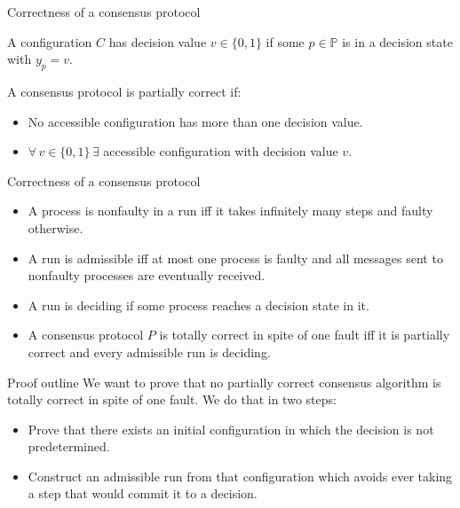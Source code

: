 \documentclass{beamer}
\begin{document}
\begin{frame}{Correctness of a consensus protocol}
  \begin{definition}
    A configuration $C$ has decision value $v \in \{ 0, 1 \}$ if some $p \in \mathbb{P}$ is in a decision state with $y_p = v$.
  \end{definition}
  \begin{definition}
    A consensus protocol is \alert{partially correct} if:
    \begin{itemize}
      \item No accessible configuration has more than one decision value.
      \item $\forall\, v \in \{0, 1\}\,\exists$ accessible configuration with decision value $v$.
    \end{itemize}
  \end{definition}
\end{frame}

\begin{frame}{Correctness of a consensus protocol}
  \begin{itemize}
    \item A process is \alert{nonfaulty} in a run iff it takes infinitely many steps and \alert{faulty} otherwise.
    \item A run is \alert{admissible} iff at most one process is faulty and all messages sent to nonfaulty processes are eventually received.
    \item A run is \alert{deciding} if some process reaches a decision state in it.
    \item A consensus protocol $P$ is \alert{totally correct in spite of one fault} iff it is partially correct and every admissible run is deciding.
  \end{itemize}
\end{frame}

\begin{frame}{Proof outline}
  We want to prove that no partially correct consensus algorithm is totally correct in spite of one fault. We do that in two steps:
  \begin{itemize}
    \item Prove that there exists an initial configuration in which the decision is not predetermined.
    \item Construct an admissible run from that configuration which avoids ever taking a step that would commit it to a decision.
  \end{itemize}
\end{frame}
\end{document}
